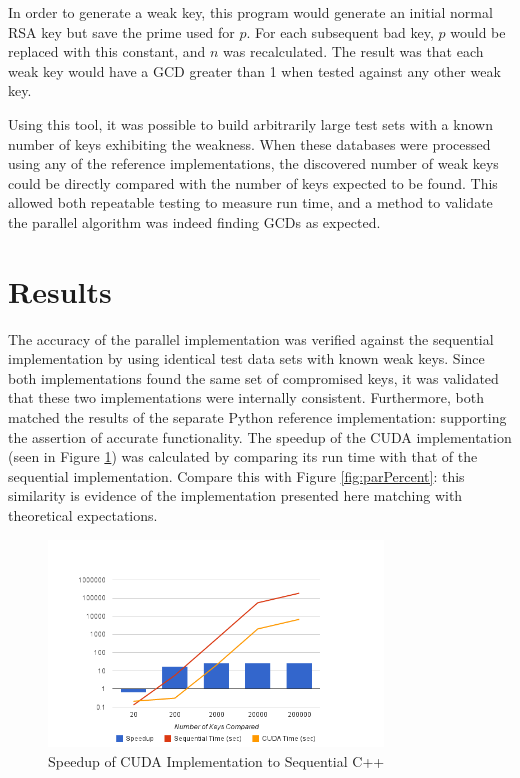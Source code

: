 \documentclass[12pt]{ucthesis}
\begin{document}
In order to generate a weak key, this program would generate an initial 
normal RSA key but save the prime used for $p$. For each subsequent bad key, 
$p$ would be replaced with this constant, and $n$ was recalculated. The 
result was that each weak key would have a GCD greater than 1 when 
tested against any other weak key. 

Using this tool, it was possible to build arbitrarily large test sets with a 
known number of keys exhibiting the weakness. When these databases 
were processed using any of the reference implementations, the 
discovered number of weak keys could be directly compared with the 
number of keys expected to be found. This allowed both repeatable testing to 
measure run time, and a method to validate the parallel algorithm was indeed 
finding GCDs as expected. 

\section{Results}
The accuracy of the parallel implementation was verified against the 
sequential implementation by using identical test data sets with known 
weak keys. Since both implementations found the same set of compromised keys,
it was validated that these two implementations 
were internally consistent. Furthermore, both matched the results of the 
separate Python reference implementation: supporting the assertion of accurate 
functionality. The speedup of the CUDA implementation (seen in Figure 
\ref{fig:speedup}) was calculated by comparing its run time with that of the sequential 
implementation. Compare this 
with Figure \ref{fig:parPercent}: this similarity is evidence of the 
implementation presented here matching with theoretical expectations.

\begin{figure}
   \centering
   \includegraphics[width=3.5in]{chart_1.png}
   \caption{Speedup of CUDA Implementation to Sequential C++}
   \label{fig:speedup}
\end{figure}
\end{document}
